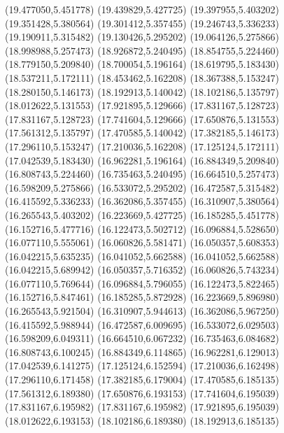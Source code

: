 {{\lineto(19.477050,5.451778)
\lineto(19.439829,5.427725)
\lineto(19.397955,5.403202)
\lineto(19.351428,5.380564)
\lineto(19.301412,5.357455)
\lineto(19.246743,5.336233)
\lineto(19.190911,5.315482)
\lineto(19.130426,5.295202)
\lineto(19.064126,5.275866)
\lineto(18.998988,5.257473)
\lineto(18.926872,5.240495)
\lineto(18.854755,5.224460)
\lineto(18.779150,5.209840)
\lineto(18.700054,5.196164)
\lineto(18.619795,5.183430)
\lineto(18.537211,5.172111)
\lineto(18.453462,5.162208)
\lineto(18.367388,5.153247)
\lineto(18.280150,5.146173)
\lineto(18.192913,5.140042)
\lineto(18.102186,5.135797)
\lineto(18.012622,5.131553)
\lineto(17.921895,5.129666)
\lineto(17.831167,5.128723)
\lineto(17.831167,5.128723)
\lineto(17.741604,5.129666)
\lineto(17.650876,5.131553)
\lineto(17.561312,5.135797)
\lineto(17.470585,5.140042)
\lineto(17.382185,5.146173)
\lineto(17.296110,5.153247)
\lineto(17.210036,5.162208)
\lineto(17.125124,5.172111)
\lineto(17.042539,5.183430)
\lineto(16.962281,5.196164)
\lineto(16.884349,5.209840)
\lineto(16.808743,5.224460)
\lineto(16.735463,5.240495)
\lineto(16.664510,5.257473)
\lineto(16.598209,5.275866)
\lineto(16.533072,5.295202)
\lineto(16.472587,5.315482)
\lineto(16.415592,5.336233)
\lineto(16.362086,5.357455)
\lineto(16.310907,5.380564)
\lineto(16.265543,5.403202)
\lineto(16.223669,5.427725)
\lineto(16.185285,5.451778)
\lineto(16.152716,5.477716)
\lineto(16.122473,5.502712)
\lineto(16.096884,5.528650)
\lineto(16.077110,5.555061)
\lineto(16.060826,5.581471)
\lineto(16.050357,5.608353)
\lineto(16.042215,5.635235)
\lineto(16.041052,5.662588)
\lineto(16.041052,5.662588)
\lineto(16.042215,5.689942)
\lineto(16.050357,5.716352)
\lineto(16.060826,5.743234)
\lineto(16.077110,5.769644)
\lineto(16.096884,5.796055)
\lineto(16.122473,5.822465)
\lineto(16.152716,5.847461)
\lineto(16.185285,5.872928)
\lineto(16.223669,5.896980)
\lineto(16.265543,5.921504)
\lineto(16.310907,5.944613)
\lineto(16.362086,5.967250)
\lineto(16.415592,5.988944)
\lineto(16.472587,6.009695)
\lineto(16.533072,6.029503)
\lineto(16.598209,6.049311)
\lineto(16.664510,6.067232)
\lineto(16.735463,6.084682)
\lineto(16.808743,6.100245)
\lineto(16.884349,6.114865)
\lineto(16.962281,6.129013)
\lineto(17.042539,6.141275)
\lineto(17.125124,6.152594)
\lineto(17.210036,6.162498)
\lineto(17.296110,6.171458)
\lineto(17.382185,6.179004)
\lineto(17.470585,6.185135)
\lineto(17.561312,6.189380)
\lineto(17.650876,6.193153)
\lineto(17.741604,6.195039)
\lineto(17.831167,6.195982)
\lineto(17.831167,6.195982)
\lineto(17.921895,6.195039)
\lineto(18.012622,6.193153)
\lineto(18.102186,6.189380)
\lineto(18.192913,6.185135)
}}
